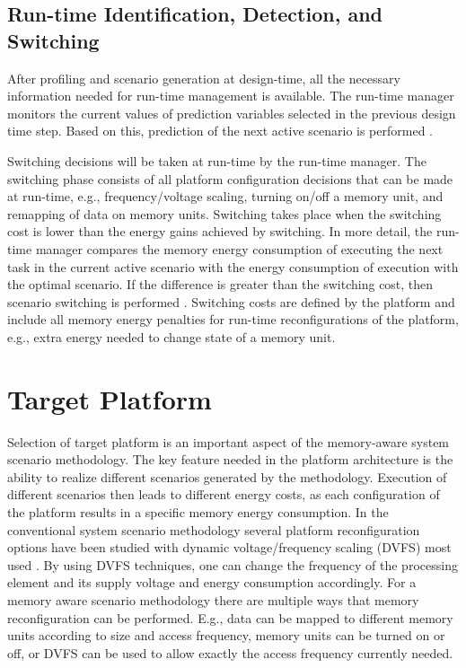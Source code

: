 \subsection{Run-time Identification, Detection, and Switching}

After profiling and scenario generation at design-time, all the necessary information needed for run-time management is available. The run-time manager monitors the current values of prediction variables selected in the previous design time step. Based on this, prediction of the next active scenario is performed  \cite{tcm}. 

Switching decisions will be taken at run-time by the run-time manager. The switching phase consists of all platform configuration decisions that can be made at run-time, e.g., frequency/voltage scaling, turning on/off a memory unit, and remapping of data on memory units. Switching takes place when the switching cost is lower than the energy gains achieved by switching. In more detail, the run-time manager compares the memory energy consumption of executing the next task in the current active scenario with the energy consumption of execution with the optimal scenario. If the difference is greater than the switching cost, then scenario switching is performed \cite{tcm}. Switching costs are defined by the platform and include all memory energy penalties for run-time reconfigurations of the platform, e.g., extra energy needed to change state of a memory unit.

\section{Target Platform}
\label{sec:platform}

Selection of target platform is an important aspect of the memory-aware system scenario methodology. The key feature needed in the platform architecture is the ability to realize different scenarios generated by the methodology. Execution of different scenarios then leads to different energy costs, as each configuration of the platform results in a specific memory energy consumption. In the conventional system scenario methodology several platform reconfiguration options have been studied \cite{Gheorghita2007} with dynamic voltage/frequency scaling (DVFS) most used \cite{dvfs}. By using DVFS techniques, one can change the frequency of the processing element and its supply voltage and energy consumption accordingly. For a memory aware scenario methodology there are multiple ways that memory reconfiguration can be performed. E.g., data can be mapped to different memory units according to size and access frequency, memory units can be turned on or off, or DVFS can be used to allow exactly the access frequency currently needed. 

